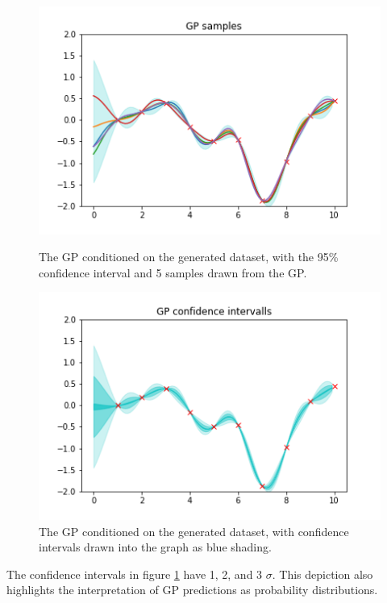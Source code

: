 \begin{figure}[h!]
	\centering
	\begin{minipage}{0.45\textwidth}
		\centering
		\includegraphics[scale=0.6]{img/05_3/gp_samples.png} %
		\caption[Trained GP samples with covariance interval]{The GP conditioned on the generated dataset, with the 95\% confidence interval and 5 samples drawn from the GP. }
		\label{fig:GP_sqexp_samples}
	\end{minipage}\hfill
	\begin{minipage}{0.45\textwidth}
		\centering
		\includegraphics[scale=0.6]{img/05_3/gp_confints.png} %
		\caption[Trained GP with covariance intervals]{The GP conditioned on the generated dataset, with confidence intervals drawn into the graph as blue shading. }
		\label{fig:GP_confidence_intervals}
	\end{minipage}
\end{figure}
The confidence intervals in figure \ref{fig:GP_confidence_intervals} have 1, 2, and 3 $\sigma$. This depiction also highlights the interpretation of GP predictions as probability distributions. \newpage